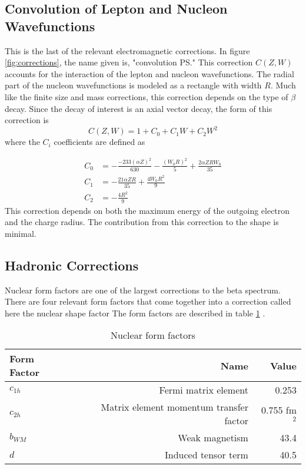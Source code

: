\documentclass[../MaxHughesThesis.tex]{subfiles}
\begin{document}
\subsection{Convolution of Lepton and Nucleon Wavefunctions}

This is the last of the relevant electromagnetic corrections.
In figure \ref{fig:corrections}, the name given is, "convolution PS."
This correction $C(Z,W)$ accounts for the interaction of the lepton and nucleon wavefunctions. 
The radial part of the nucleon wavefunctions is  modeled as a rectangle with width $R$.
Much like the finite size and mass corrections, this correction depends on the type of $\beta$ decay.
Since the decay of interest is an axial vector decay, the form of this correction is %
\begin{equation}
	C(Z,W) = 1 + C_{0} + C_{1} W + C_{2} W^{2}
	\label{eq:nucandlepconv}
\end{equation}
where the $C_{i}$ coefficients are defined as \cite{WIL90} %

\begin{equation}
	\label{eq:csconvocorrection}
	\begin{split}
	C_{0} & = -\frac{-233(\alpha Z)^{2}}{630} - \frac{(W_{0} R)^{2}}{5} + \frac{2 \alpha Z R W_{0}}{35} \\
	C_{1} & = -\frac{21 \alpha Z R}{35} + \frac{4 W_{0} R^{2}}{9} \\
	C_{2} & = -\frac{4 R^{2}}{9}
	\end{split}
\end{equation}
This correction depends on both the maximum energy of the outgoing electron and the charge radius.
The contribution from this correction to the shape is minimal. 

\subsection{Hadronic Corrections}

Nuclear form factors are one of the largest corrections to the beta spectrum.
There are four relevant form factors that come together into a correction called here the nuclear shape factor
The form factors are described in table \ref{tab:formfact} \cite{Min11} \cite{Cal77}.

\begin{table}[!hbt]
	\centering
	\caption{Nuclear form factors}
		\begin{tabular}{lrr}
		Form Factor & Name & Value \\ \hline
		$c_{1h}$ & Fermi matrix element & 0.253  \\
		$c_{2h}$ & Matrix element momentum transfer factor & 0.755 fm$^{2}$  \\
		$b_{WM}$ & Weak magnetism & 43.4   \\
		$d$ & Induced tensor term & 40.5 
		\end{tabular}
	\label{tab:formfact}
\end{table}
\end{document}
